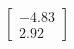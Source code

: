 \documentclass[preview]{standalone}
\begin{document}
\begin{align*}
\begin{bmatrix} -4.83 \\ 2.92 \end{bmatrix}
\end{align*}
\end{document}
